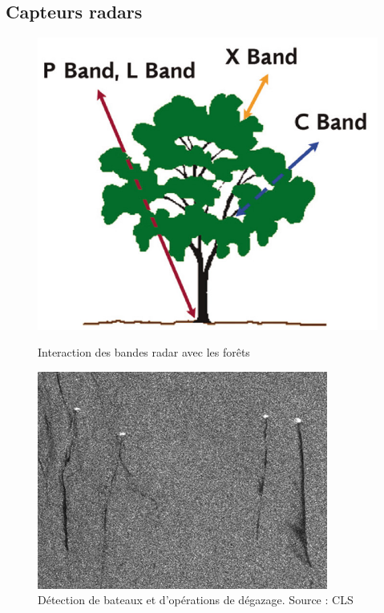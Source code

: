 \documentclass[11pt]{beamer}
\begin{document}
\subsection{Capteurs radars}
\begin{frame}{}
\begin{figure}[!h]
\centering
\begin{minipage}[c]{.46\linewidth}
      \includegraphics[scale=0.45]{img/radar_band.jpg}
      \caption{Interaction des bandes radar avec les forêts}
   \end{minipage} \hfill
   \begin{minipage}[c]{.46\linewidth}
      \includegraphics[scale=0.4]{img/radar-pollution.jpg}
      \caption{Détection de bateaux et d'opérations de dégazage. Source : CLS}
   \end{minipage}
\end{figure}
\end{frame}
\end{document}

